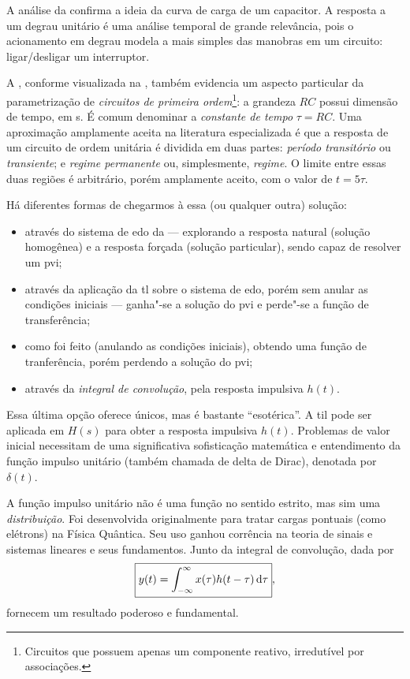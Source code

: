 A análise da  confirma a ideia da curva de carga de um capacitor. A resposta a um degrau unitário é uma análise temporal de grande relevância, pois o acionamento em degrau modela a mais simples das manobras em um circuito: ligar\slash desligar um interruptor.

A , conforme visualizada na , também evidencia um aspecto particular da parametrização de \emph{circuitos de primeira ordem}\footnote{Circuitos que possuem apenas um componente reativo, irredutível por associações.}: a grandeza $RC$ possui dimensão de tempo, em \unit{\second}. É comum denominar a \emph{constante de tempo} $\tau=RC$. Uma aproximação amplamente aceita na literatura especializada é que a resposta de um circuito de ordem unitária é dividida em duas partes: \emph{período transitório} ou \emph{transiente}; e \emph{regime permanente} ou, simplesmente, \emph{regime}. O limite entre essas duas regiões é arbitrário, porém amplamente aceito, com o valor de $t=5\tau$.

Há diferentes formas de chegarmos à essa (ou qualquer outra) solução:
\begin{itemize}
	\item através do sistema de \ac{edo} da  --- explorando a resposta natural (solução homogênea) e a resposta forçada (solução particular), sendo capaz de resolver um \ac{pvi};
	\item através da aplicação da \ac{tl} sobre o sistema de \ac{edo}, porém sem anular as condições iniciais --- ganha"-se a solução do \ac{pvi} e perde"-se a função de transferência;
	\item como foi feito (anulando as condições iniciais), obtendo uma função de tranferência, porém perdendo a solução do \ac{pvi};
	\item através da \emph{integral de convolução}, pela resposta impulsiva $h(t)$.
\end{itemize}

Essa última opção oferece  únicos, mas é bastante \enquote{esotérica}. A \ac{til} pode ser aplicada em $H(s)$ para obter a resposta impulsiva $h(t)$. Problemas de valor inicial necessitam de uma significativa sofisticação matemática e entendimento da função impulso unitário (também chamada de delta de Dirac), denotada por $\delta(t)$.

A função impulso unitário não é uma função no sentido estrito, mas sim uma \emph{distribuição}. Foi desenvolvida originalmente para tratar cargas pontuais (como elétrons) na Física Quântica. Seu uso ganhou corrência na teoria de sinais e sistemas lineares e seus fundamentos. Junto da integral de convolução, dada por
\begin{equation}\label{eq:conv}
	\boxed{y(t)=\inte{x(\tau)h(t-\tau)}{\tau}{-\infty}{\infty}},
\end{equation}
fornecem um resultado poderoso e fundamental.

